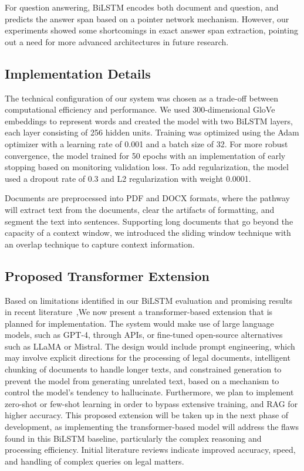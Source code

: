 \documentclass{llncs}
\begin{document}
For question answering, BiLSTM encodes both document and question, and predicts the answer span based on a pointer network mechanism. However, our experiments showed some shortcomings in exact answer span extraction, pointing out a need for more advanced architectures in future research.

\subsection{Implementation Details}

The technical configuration of our system was chosen as a trade-off between computational efficiency and performance. We used 300-dimensional GloVe embeddings to represent words and created the model with two BiLSTM layers, each layer consisting of 256 hidden units. Training was optimized using the Adam optimizer with a learning rate of 0.001 and a batch size of 32. For more robust convergence, the model trained for 50 epochs with an implementation of early stopping based on monitoring validation loss. To add regularization, the model used a dropout rate of 0.3 and L2 regularization with weight 0.0001. 

Documents are preprocessed into PDF and DOCX formats, where the pathway will extract text from the documents, clear the artifacts of formatting, and segment the text into sentences. Supporting long documents that go beyond the capacity of a context window, we introduced the sliding window technique with an overlap technique to capture context information.

\subsection{Proposed Transformer Extension}

Based on limitations identified in our BiLSTM evaluation and promising results in recent literature~\cite{nigam2023legal,sharma2024legal,albayati2025multi},We now present a transformer-based extension that is planned for implementation. The system would make use of large language models, such as GPT-4, through APIs, or fine-tuned open-source alternatives such as LLaMA or Mistral. The design would include prompt engineering, which may involve explicit directions for the processing of legal documents, intelligent chunking of documents to handle longer texts, and constrained generation to prevent the model from generating unrelated text, based on a mechanism to control the model's tendency to hallucinate. Furthermore, we plan to implement zero-shot or few-shot learning in order to bypass extensive training, and RAG for higher accuracy. This proposed extension will be taken up in the next phase of development, as implementing the transformer-based model will address the flaws found in this BiLSTM baseline, particularly the complex reasoning and processing efficiency. Initial literature reviews indicate improved accuracy, speed, and handling of complex queries on legal matters.
\end{document}
